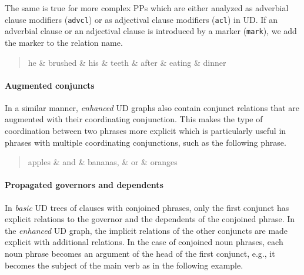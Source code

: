 \documentclass[10pt, a4paper]{article}
\begin{document}
The same is true for more complex PPs which are either analyzed as adverbial 
clause modifiers (\texttt{advcl}) or as adjectival clause modifiers (\texttt{acl}) in UD.
If an adverbial clause or an adjectival clause is introduced by a marker (\texttt{mark}),
we add the marker to the relation name.

\begin{quote}
\begin{center}
\begin{dependency}[column sep=0.2em, edge unit distance=2.25ex]
  \begin{deptext}
    he \& brushed \& his \& teeth \& after \& eating \& dinner \\
  \end{deptext}
\end{dependency}
\end{center}
\end{quote}

\paragraph{Augmented conjuncts} In a similar manner, \textit{enhanced} UD 
graphs also contain conjunct relations that are augmented with their coordinating 
conjunction. This makes the type of coordination between two phrases more 
explicit which is particularly useful in phrases with multiple coordinating conjunctions,
such as the following phrase.

\begin{quote}
\begin{center}
\begin{dependency}[column sep=0.2em, edge unit distance=2.25ex]
  \begin{deptext}
    apples \& and \& bananas, \& or \& oranges  \\
  \end{deptext}
\end{dependency}
\end{center}
\end{quote}

\paragraph{Propagated governors and dependents} In \textit{basic} UD trees of clauses with conjoined phrases, only the first conjunct has explicit
relations to the governor and the dependents of the conjoined phrase. In the \textit{enhanced} UD graph,
the implicit relations of the other conjuncts are made explicit with additional relations. In the case of conjoined noun phrases,
each noun phrase becomes an argument of the head of the first conjunct, e.g., it becomes the subject of the main verb as in the following example. 
\end{document}
